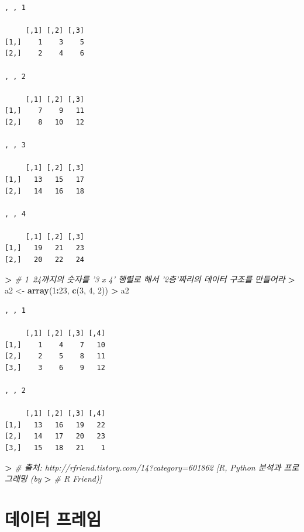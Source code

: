 \documentclass[11pt,a4paper]{book}
\newenvironment{Shaded}{\begin{snugshade}}{\end{snugshade}}
\newcommand{\KeywordTok}[1]{\textcolor[rgb]{0.13,0.29,0.53}{\textbf{#1}}}
\newcommand{\DecValTok}[1]{\textcolor[rgb]{0.00,0.00,0.81}{#1}}
\newcommand{\StringTok}[1]{\textcolor[rgb]{0.31,0.60,0.02}{#1}}
\newcommand{\CommentTok}[1]{\textcolor[rgb]{0.56,0.35,0.01}{\textit{#1}}}
\newcommand{\OperatorTok}[1]{\textcolor[rgb]{0.81,0.36,0.00}{\textbf{#1}}}
\newcommand{\ErrorTok}[1]{\textcolor[rgb]{0.64,0.00,0.00}{\textbf{#1}}}
\newcommand{\NormalTok}[1]{#1}
\theoremstyle{definition}
\theoremstyle{definition}
\theoremstyle{definition}
\theoremstyle{remark}
\begin{document}
\begin{verbatim}
, , 1

     [,1] [,2] [,3]
[1,]    1    3    5
[2,]    2    4    6

, , 2

     [,1] [,2] [,3]
[1,]    7    9   11
[2,]    8   10   12

, , 3

     [,1] [,2] [,3]
[1,]   13   15   17
[2,]   14   16   18

, , 4

     [,1] [,2] [,3]
[1,]   19   21   23
[2,]   20   22   24
\end{verbatim}

\begin{Shaded}
\begin{Highlighting}[]
\OperatorTok{>}\StringTok{ }\CommentTok{# 1~24까지의 숫자를 '3 x 4' 행렬로 해서 '2층'짜리의 데이터 구조를 만들어라}
\ErrorTok{>}\StringTok{ }\NormalTok{a2 <-}\StringTok{ }\KeywordTok{array}\NormalTok{(}\DecValTok{1}\OperatorTok{:}\DecValTok{23}\NormalTok{, }\KeywordTok{c}\NormalTok{(}\DecValTok{3}\NormalTok{, }\DecValTok{4}\NormalTok{, }\DecValTok{2}\NormalTok{))}
\OperatorTok{>}\StringTok{ }\NormalTok{a2}
\end{Highlighting}
\end{Shaded}

\begin{verbatim}
, , 1

     [,1] [,2] [,3] [,4]
[1,]    1    4    7   10
[2,]    2    5    8   11
[3,]    3    6    9   12

, , 2

     [,1] [,2] [,3] [,4]
[1,]   13   16   19   22
[2,]   14   17   20   23
[3,]   15   18   21    1
\end{verbatim}

\begin{Shaded}
\begin{Highlighting}[]
\OperatorTok{>}\StringTok{ }\CommentTok{# 출처: http://rfriend.tistory.com/14?category=601862 [R, Python 분석과 프로그래밍 (by}
\ErrorTok{>}\StringTok{ }\CommentTok{# R Friend)]}
\end{Highlighting}
\end{Shaded}

\normalsize

\section{데이터 프레임}\label{-}
\end{document}
